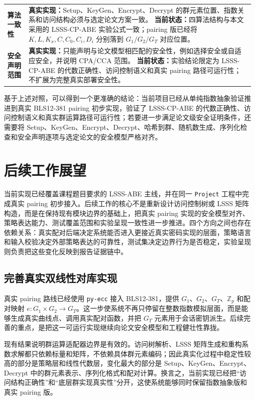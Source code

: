 \begin{longtable}{>{\raggedright\arraybackslash}p{} >{\raggedright\arraybackslash}p{}}
\textbf{算法一致性} &
\textbf{真实实现：}Setup、KeyGen、Encrypt、Decrypt 的群元素位置、指数关系和访问结构必须与选定论文方案一致。\newline
\textbf{当前状态：}四算法结构与本文采用的 LSSS-CP-ABE 实验公式一致；pairing 版已经将 $K,L,K_x,C,C_0,C_i,D_i$ 分别落到 $G_1/G_2/G_T$ 对应位置。\\[0.45em]
\textbf{安全声明范围} &
\textbf{真实实现：}只能声明与论文模型相匹配的安全性，例如选择安全或自适应安全，并说明 CPA/CCA 范围。\newline
\textbf{当前状态：}实验结论限定为 LSSS-CP-ABE 的代数正确性、访问控制语义和真实 pairing 路径可运行性；不扩展为完整真实部署安全性。\\
\bottomrule
\end{longtable}
\endgroup

基于上述对照，可以得到一个更准确的结论：当前项目已经从单纯指数抽象验证推进到真实 BLS12-381 pairing 初步实现，验证了 LSSS-CP-ABE 的代数正确性、访问控制语义和真实群运算路径可运行性；若要进一步满足论文级安全证明条件，还需要将 Setup、KeyGen、Encrypt、Decrypt、哈希到群、随机数生成、序列化检查和安全声明逐项与选定论文的安全模型严格对齐。

\section{后续工作展望}

当前实现已经覆盖课程题目要求的 LSSS-ABE 主线，并在同一 \verb|Project| 工程中完成真实 pairing 初步接入。后续工作的核心不是重新设计访问控制树或 LSSS 矩阵构造，而是在保持现有模块边界的基础上，把真实 pairing 实现的安全模型对齐、策略表达能力、测试覆盖范围和实验呈现一致性进一步推进。四个方向之间也存在依赖关系：真实配对后端决定系统能否进入更接近真实密码实现的层面，策略语言和输入校验决定外部策略表达的可靠性，测试集决定边界行为是否稳定，实验呈现则负责把这些变化反映到报告证据链中。

\subsection{完善真实双线性对库实现}

真实 pairing 路线已经使用 \verb|py-ecc| 接入 BLS12-381，提供 $G_1$、$G_2$、$G_T$、$\mathbb{Z}_p$ 和配对映射 $e:G_1\times G_2\rightarrow G_T$。这一步使系统不再只停留在整数指数模拟层面，而是能够生成真实曲线点、调用真实配对函数，并把 $G_T$ 元素用于会话密钥派生。后续完善的重点，是把这一可运行实现继续向论文安全模型和工程健壮性靠拢。

现有结果说明群运算适配器边界是有效的。访问树解析、LSSS 矩阵生成和重构系数求解都只依赖标量和矩阵，不依赖具体群元素编码；因此真实化过程中稳定性较高的部分是策略层和线性代数层，变化最大的部分是 Setup、KeyGen、Encrypt、Decrypt 中的群元素表示、序列化格式和配对计算。换言之，当前实现已经把“访问结构正确性”和“底层群实现真实性”分开，这使系统能够同时保留指数抽象版和真实 pairing 版。

